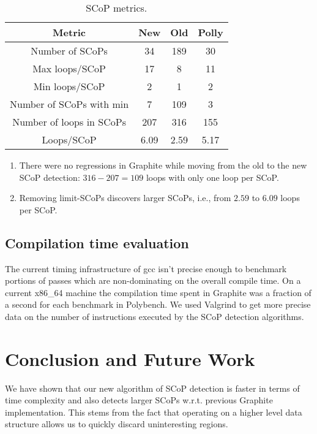 \documentclass{sigplanconf}
\begin{document}
\begin{table}[h!]
  \begin{center}
    \begin{tabular}{|c|c|c|c|}
      \hline
      Metric                   & New  & Old  & Polly  \\
      \hline
      Number of SCoPs          & 34   & 189  & 30     \\
      Max loops/SCoP           & 17   & 8    & 11     \\
      Min loops/SCoP           & 2    & 1    & 2      \\
      Number of SCoPs with min & 7    & 109  & 3      \\
      Number of loops in SCoPs & 207  & 316  & 155    \\
      Loops/SCoP               & 6.09 & 2.59 & 5.17   \\
      \hline
    \end{tabular}
  \end{center}
  \caption{SCoP metrics.}
  \label{tab:table1}
\end{table}

\begin{enumerate}
  \item There were no regressions in Graphite while moving from the old to the
    new SCoP detection: $316 - 207 = 109$ loops with only one loop per SCoP.
  \item Removing limit-SCoPs discovers larger SCoPs, i.e., from $2.59$ to $6.09$
    loops per SCoP.
\end{enumerate}

\subsection{Compilation time evaluation}
The current timing infrastructure of gcc isn't precise enough to benchmark
portions of passes which are non-dominating on the overall compile time.  On a
current x86\_64 machine the compilation time spent in Graphite was a fraction of
a second for each benchmark in Polybench.  We used Valgrind to get more precise
data on the number of instructions executed by the SCoP detection algorithms.

\section{Conclusion and Future Work}
We have shown that our new algorithm of SCoP detection is faster in terms of
time complexity and also detects larger SCoPs w.r.t. previous Graphite
implementation.  This stems from the fact that operating on a higher level data
structure allows us to quickly discard uninteresting regions.
\end{document}
